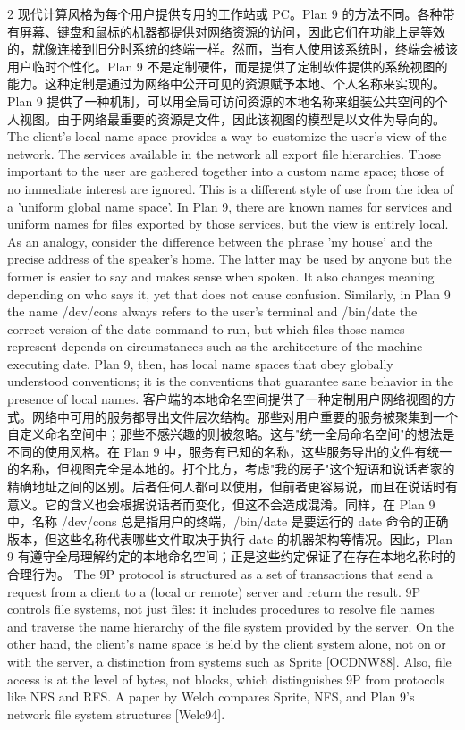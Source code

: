 \documentclass{article}
\begin{document}
\begin{paracol}{2}
\switchcolumn
现代计算风格为每个用户提供专用的工作站或 PC。Plan 9 的方法不同。各种带有屏幕、键盘和鼠标的机器都提供对网络资源的访问，因此它们在功能上是等效的，就像连接到旧分时系统的终端一样。然而，当有人使用该系统时，终端会被该用户临时个性化。Plan 9 不是定制硬件，而是提供了定制软件提供的系统视图的能力。这种定制是通过为网络中公开可见的资源赋予本地、个人名称来实现的。Plan 9 提供了一种机制，可以用全局可访问资源的本地名称来组装公共空间的个人视图。由于网络最重要的资源是文件，因此该视图的模型是以文件为导向的。
\switchcolumn*
The client's local name space provides a way to customize the user's view of the network. The services available in the network all export file hierarchies. Those important to the user are gathered together into a custom name space; those of no immediate interest are ignored. This is a different style of use from the idea of a 'uniform global name space'. In Plan 9, there are known names for services and uniform names for files exported by those services, but the view is entirely local. As an analogy, consider the difference between the phrase 'my house' and the precise address of the speaker's home. The latter may be used by anyone but the former is easier to say and makes sense when spoken. It also changes meaning depending on who says it, yet that does not cause confusion. Similarly, in Plan 9 the name /dev/cons always refers to the user's terminal and /bin/date the correct version of the date command to run, but which files those names represent depends on circumstances such as the architecture of the machine executing date. Plan 9, then, has local name spaces that obey globally understood conventions; it is the conventions that guarantee sane behavior in the presence of local names.
\switchcolumn
客户端的本地命名空间提供了一种定制用户网络视图的方式。网络中可用的服务都导出文件层次结构。那些对用户重要的服务被聚集到一个自定义命名空间中；那些不感兴趣的则被忽略。这与"统一全局命名空间"的想法是不同的使用风格。在 Plan 9 中，服务有已知的名称，这些服务导出的文件有统一的名称，但视图完全是本地的。打个比方，考虑"我的房子"这个短语和说话者家的精确地址之间的区别。后者任何人都可以使用，但前者更容易说，而且在说话时有意义。它的含义也会根据说话者而变化，但这不会造成混淆。同样，在 Plan 9 中，名称 /dev/cons 总是指用户的终端，/bin/date 是要运行的 date 命令的正确版本，但这些名称代表哪些文件取决于执行 date 的机器架构等情况。因此，Plan 9 有遵守全局理解约定的本地命名空间；正是这些约定保证了在存在本地名称时的合理行为。
\switchcolumn*
The 9P protocol is structured as a set of transactions that send a request from a client to a (local or remote) server and return the result. 9P controls file systems, not just files: it includes procedures to resolve file names and traverse the name hierarchy of the file system provided by the server. On the other hand, the client's name space is held by the client system alone, not on or with the server, a distinction from systems such as Sprite [OCDNW88]. Also, file access is at the level of bytes, not blocks, which distinguishes 9P from protocols like NFS and RFS. A paper by Welch compares Sprite, NFS, and Plan 9's network file system structures [Welc94].

\end{paracol}
\end{document}
